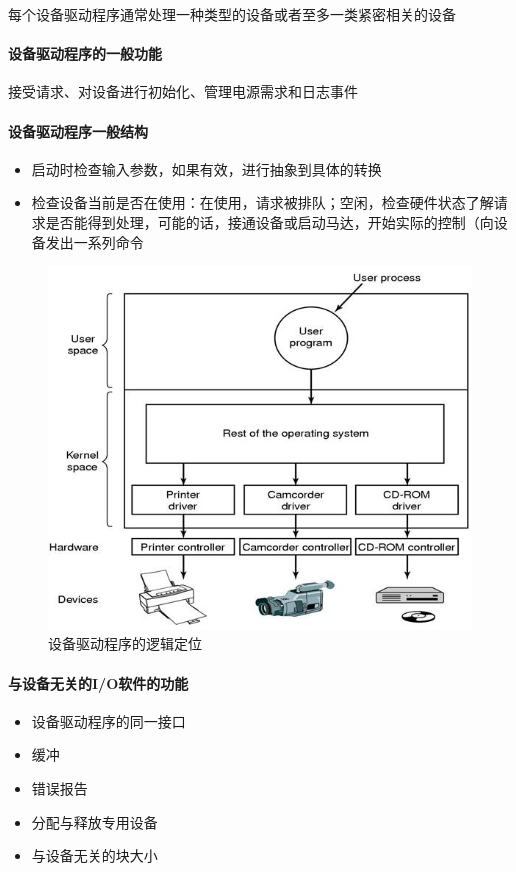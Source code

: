 \documentclass[UTF8,a4paper]{ctexart}
\begin{document}
每个设备驱动程序通常处理一种类型的设备或者至多一类紧密相关的设备

\paragraph{设备驱动程序的一般功能} 接受请求、对设备进行初始化、管理电源需求和日志事件

\paragraph{设备驱动程序一般结构}
\begin{itemize}
	\item 启动时检查输入参数，如果有效，进行抽象到具体的转换
	\item 检查设备当前是否在使用：在使用，请求被排队；空闲，检查硬件状态了解请求是否能得到处理，可能的话，接通设备或启动马达，开始实际的控制（向设备发出一系列命令
\end{itemize}

\begin{figure}[H]
	\centering
	\includegraphics[scale = 0.5]{assets/ModernOperatingSystems/2018-01-10-16-59-35.png}
	\caption{设备驱动程序的逻辑定位}
\end{figure}

\paragraph{与设备无关的I/O软件的功能}
\begin{itemize}
	\item 设备驱动程序的同一接口
	\item 缓冲
	\item 错误报告
	\item 分配与释放专用设备
	\item 与设备无关的块大小
\end{itemize}
\end{document}
